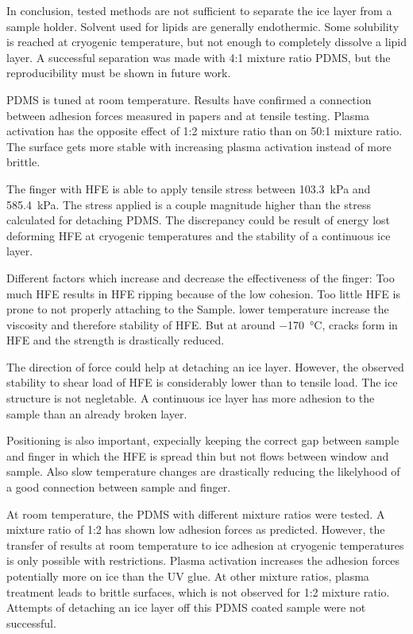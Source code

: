 
In conclusion, tested methods are not sufficient to separate the ice layer from a sample holder. Solvent used for lipids are generally endothermic. Some solubility is reached at cryogenic temperature, but not enough to completely dissolve a lipid layer. A successful separation was made with 4:1 mixture ratio PDMS, but the reproducibility must be shown in future work.

PDMS is tuned at room temperature. Results have confirmed a connection between adhesion forces measured in papers and at tensile testing. Plasma activation has the opposite effect of 1:2 mixture ratio than on 50:1 mixture ratio. The surface gets more stable with increasing plasma activation instead of more brittle.

The finger with HFE is able to apply tensile stress between \SI{103.3}{\kilo\pascal} and \SI{585.4}{\kilo\pascal}. The stress applied is a couple magnitude higher than the stress calculated for detaching PDMS. The discrepancy could be result of energy lost deforming HFE at cryogenic temperatures and the stability of a continuous ice layer.

Different factors which increase and decrease the effectiveness of the finger: Too much HFE results in HFE ripping because of the low cohesion. Too little HFE is prone to not properly attaching to the Sample. lower temperature increase the viscosity and therefore stability of HFE. But at around \SI{-170}{\degreeCelsius}, cracks form in HFE and the strength is drastically reduced.

The direction of force could help at detaching an ice layer. However, the observed stability to shear load of HFE is considerably lower than to tensile load. The ice structure is not negletable. A continuous ice layer has more adhesion to the sample than an already broken layer. 

Positioning is also important, expecially keeping the correct gap between sample and finger in which the HFE is spread thin but not flows between window and sample. Also slow temperature changes are drastically reducing the likelyhood of a good connection between sample and finger.

At room temperature, the PDMS with different mixture ratios were tested. A mixture ratio of 1:2 has shown low adhesion forces as predicted. However, the transfer of results at room temperature to ice adhesion at cryogenic temperatures is only possible with restrictions. Plasma activation increases the adhesion forces potentially more on ice than the UV glue. At other mixture ratios, plasma treatment leads to brittle surfaces, which is not observed for 1:2 mixture ratio. Attempts of detaching an ice layer off this PDMS coated sample were not successful.

